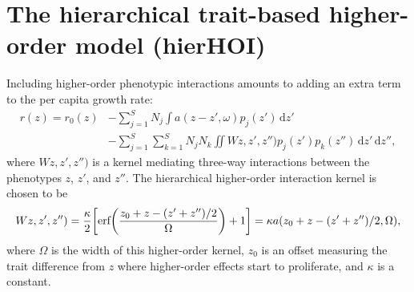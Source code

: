 \documentclass[10pt]{article}
\newcommand{\ud}{\text{d}}
\let\originalleft\left
\let\originalright\right
\renewcommand{\left}{\mathopen{}\mathclose\bgroup\originalleft}
\renewcommand{\right}{\aftergroup\egroup\originalright}
\begin{document}
\section{The hierarchical trait-based higher-order model (hierHOI)}

Including higher-order phenotypic interactions amounts to adding an extra term to the per capita growth rate: 
\begin{equation}
  \begin{aligned}
  \label{hierhoi:pgr}
  r(z)
  = r_0(z) &- \sum_{j=1}^S N_j \int a(z-z',\omega) p_j(z') \,\ud z'
  \\ &- \sum_{j=1}^S \sum_{k=1}^S N_j N_k \iint Wz,z',z'') p_j(z') p_k(z'')
  \,\ud z' \,\ud z'' ,
  \end{aligned}
\end{equation}
where $Wz,z',z'')$ is a kernel mediating three-way interactions between the phenotypes $z$, $z'$, and $z''$. The hierarchical higher-order interaction kernel is chosen to be
\begin{equation}   
  \label{hierhoi:intkernel}
  Wz,z',z'')
  = \frac{\kappa}{2} \left[
  \text{erf} \left( \frac{z_0 + z-(z'+z'')/2}{\Omega}\right) + 1 \right]
  = \kappa a(z_0+z-(z'+z'')/2, \Omega) ,
\end{equation}
where $\Omega$ is the width of this higher-order kernel, $z_0$ is an offset measuring the trait difference from $z$ where higher-order effects start to proliferate, and $\kappa$ is a constant.
\end{document}
